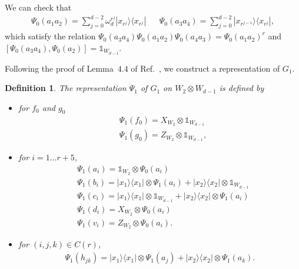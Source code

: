 \documentclass[11pt,letterpaper]{article}
\newcommand{\ketbra}[2]{|#1\rangle\langle#2|}
\newcommand{\x}{\otimes}
\newcommand{\1}{\mathbb{1}}
\newtheorem{definition}[theorem]{Definition}
\theoremstyle{definition}
\begin{document}
We can check that
\begin{align*}
	\Psi_0(a_1a_2) =  \sum_{j=0}^{d-2} \omega_d^{r^j} \ketbra{x_{r^j}}{x_{r^j}} &&
	\Psi_0(a_3a_4) =  \sum_{j=0}^{d-2} \ketbra{x_{r^{j-1}}}{x_{r^j}},
\end{align*}
which satisfy the relation $\Psi_0(a_3a_4) \Psi_0(a_1a_2) \Psi_0(a_4a_3) = \Psi_0(a_1a_2)^r$ and
$[\Psi_0(a_3a_4), \Psi_0(a_2)] = \1_{W_{d-1}}$. 

Following the proof of Lemma~$4.4$ of Ref.~\cite{slofstra2017}, we construct a representation of $G_1$.
\begin{definition}
The representation $\Psi_1$ of $G_1$ on $W_2 \x W_{d-1}$ is defined by
\begin{itemize}
\item for $f_0$ and $g_0$
\begin{align*}
	&\Psi_1(f_0) = X_{W_2} \x \1_{W_{d-1}} \\
	&\Psi_1(g_0) = Z_{W_2} \x \1_{W_{d-1}},
\end{align*}
\item
for $i = 1 \dots r+5$,
\begin{align*}
	&\Psi_1(a_i) = \1_{W_2} \x \Psi_0(a_i) \\
	&\Psi_1(b_i) = \ketbra{x_1}{x_1} \x \Psi_1(a_i) + \ketbra{x_2}{x_2} \x \1_{W_{d-1}} \\
	&\Psi_1(c_i) =\ketbra{x_1}{x_1} \x \1_{W_{d-1}} + \ketbra{x_2}{x_2} \x \Psi_1(a_i) \\
	&\Psi_1(d_i) =  X_{W_2} \x \Psi_0(a_i)\\
	&\Psi_1(v_i) = Z_{W_2} \x \Psi_0(a_i).
\end{align*}
\item for $(i,j,k) \in C(r)$,
\begin{align*}
	\Psi_1(h_{jk}) = \ketbra{x_1}{x_1} \x \Psi_1(a_j) + \ketbra{x_2}{x_2} \x \Psi_1(a_k).
\end{align*}
\end{itemize}
\end{definition}
\end{document}
